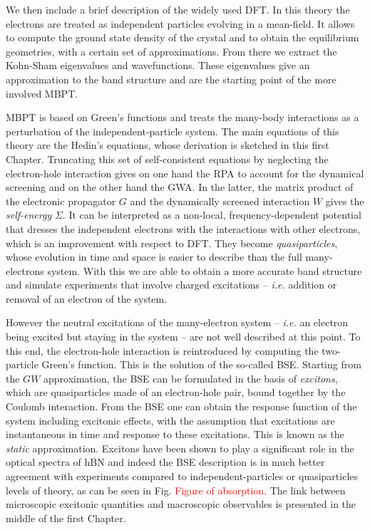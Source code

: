 We then include a brief description of the widely used \acrfull{DFT}. In this theory the electrons are treated as independent particles evolving in a mean-field. It allows to compute the ground state density of the crystal and to obtain the equilibrium geometries, with a certain set of approximations. From there we extract the Kohn-Sham eigenvalues and wavefunctions. These eigenvalues give an approximation to the band structure and are the starting point of the more involved \acrfull{MBPT}. 

\acrshort{MBPT} is based on Green's functions and treats the many-body interactions as a perturbation of the independent-particle system. The main equations of this theory are the Hedin's equations, whose derivation is sketched in this first Chapter. Truncating this set of self-consistent equations by neglecting the electron-hole interaction gives on one hand the \acrfull{RPA} to account for the dynamical screening and on the other hand the \acrfull{GWA}. In the latter, the matrix product of the electronic propagator $G$ and the dynamically screened interaction $W$ gives the \textit{self-energy} $\Sigma$. It can be interpreted as a non-local, frequency-dependent potential that dresses the independent electrons with the interactions with other electrons, which is an improvement with respect to \acrshort{DFT}. They become \textit{quasiparticles}, whose evolution in time and space is easier to describe than the full many-electrons system.
With this we are able to obtain a more accurate band structure and simulate experiments that involve charged excitations -- \textit{i.e.} addition or removal of an electron of the system. 

However the neutral excitations of the many-electron system -- \textit{i.e.} an electron being excited but staying in the system -- are not well described at this point. To this end, the electron-hole interaction is reintroduced by computing the two-particle Green's function. This is the solution of the so-called \acrfull{BSE}. Starting from the $GW$ approximation, the \acrshort{BSE} can be formulated in the basis of \textit{excitons}, which are quasiparticles made of an electron-hole pair, bound together by the Coulomb interaction. From the \acrshort{BSE} one can obtain the response function of the system including excitonic effects, with the assumption that excitations are instantaneous in time and response to these excitations. This is known as the \textit{static} approximation. Excitons have been shown to play a significant role in the optical spectra of \acrshort{hBN} and indeed the \acrshort{BSE} description is in much better agreement with experiments compared to independent-particles or quasiparticles levels of theory, as can be seen in Fig. \textcolor{red}{Figure of absorption}. The link between microscopic excitonic quantities and macroscopic observables is presented in the middle of the first Chapter. 

